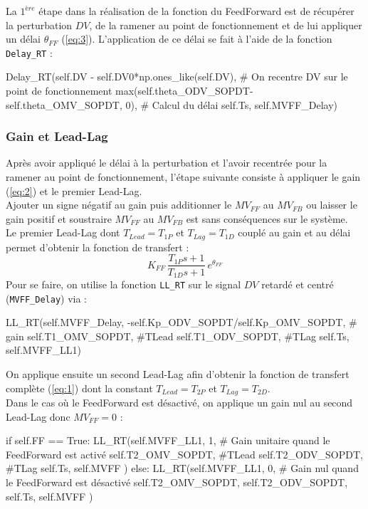 La $1^{ère}$ étape dans la réalisation de la fonction du FeedForward est de récupérer la perturbation $DV$, de la ramener au point de fonctionnement et de lui appliquer un délai $\theta_{FF}$ (\ref{eq:3}).
L'application de ce délai se fait à l'aide de la fonction \texttt{Delay\_RT} :
\begin{python*}
	Delay_RT(self.DV - self.DV0*np.ones_like(self.DV), # On recentre DV sur le point de fonctionnement
		max(self.theta_ODV_SOPDT-self.theta_OMV_SOPDT, 0), # Calcul du délai 
		self.Ts, 
		self.MVFF_Delay)
\end{python*}

\subsubsection{Gain et Lead-Lag}
Après avoir appliqué le délai à la perturbation et l'avoir recentrée pour la ramener au point de fonctionnement, l'étape suivante
consiste à appliquer le gain (\ref{eq:2}) et le premier Lead-Lag.
\\Ajouter un signe négatif au gain puis additionner le $MV_{FF}$ au $MV_{FB}$ ou laisser le gain positif et soustraire $MV_{FF}$ au $MV_{FB}$ est sans conséquences sur le système.
\\Le premier Lead-Lag dont $T_{Lead} = T_{1P}$ et $T_{Lag} = T_{1D}$ couplé au gain et au délai permet d'obtenir la fonction de transfert : 
\[K_{FF}\, \frac{T_{1P}s + 1}{T_{1D}s + 1} \, e^{\theta_{FF}}\]
Pour se faire, on utilise la fonction \texttt{LL\_RT} sur le signal $DV$ retardé et centré (\texttt{MVFF\_Delay}) via : 
\begin{python*}
	LL_RT(self.MVFF_Delay, 
		-self.Kp_ODV_SOPDT/self.Kp_OMV_SOPDT, # gain
		self.T1_OMV_SOPDT, #TLead
		self.T1_ODV_SOPDT, #TLag
		self.Ts, 
		self.MVFF_LL1)
\end{python*}
On applique ensuite un second Lead-Lag afin d'obtenir la fonction de transfert complète (\ref{eq:1}) dont la
constant $T_{Lead} = T_{2P}$ et $T_{Lag} = T_{2D}$.
\\Dans le cas où le FeedForward est désactivé, on applique un gain nul au second Lead-Lag donc $MV_{FF} = 0$ : 
\begin{python*}
	if self.FF == True:
		LL_RT(self.MVFF_LL1, 
			1, # Gain unitaire quand le FeedForward est activé
			self.T2_OMV_SOPDT, #TLead
			self.T2_ODV_SOPDT, #TLag
			self.Ts, 
			self.MVFF
		)
	else:
		LL_RT(self.MVFF_LL1, 
			0, # Gain nul quand le FeedForward est désactivé
			self.T2_OMV_SOPDT, 
			self.T2_ODV_SOPDT, 
			self.Ts, 
			self.MVFF
			) 
\end{python*}




